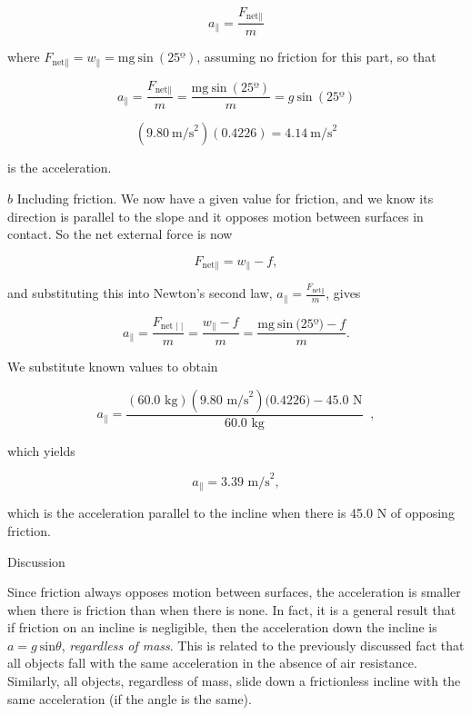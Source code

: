 \documentclass[
]{book}
\begin{document}
\leavevmode{}%
\[a_{\parallel} = \frac{F_{\text{net} \parallel}}{m}\]

where
\({{{F_{\text{net} \parallel} = w_{\parallel}} = \text{mg}\ }\text{sin}\ (\text{25º})}{}\),
assuming no friction for this part, so that

\leavevmode{}%
\[a_{\parallel} = \frac{F_{\text{net} \parallel}}{m} = \frac{\text{mg}\ \text{sin}\ (\text{25º})}{m} = g\ \text{sin}\ (\text{25º})\]

\leavevmode{}%
\[(9.80\ \text{m/s}^{2})(0.4226) = 4.14\ \text{m/s}^{2}\]

is the acceleration.

\(b\) Including friction. We now have a given value for friction, and we
know its direction is parallel to the slope and it opposes motion
between surfaces in contact. So the net external force is now

\leavevmode{}%
\[{F_{\text{net} \parallel} = {w_{\parallel} - f}},\]

and substituting this into Newton's second law,
\({a_{\parallel} = \frac{F_{\text{net} \parallel}}{m}}{}\)\emph{},
gives

\leavevmode{}%
\[{{{a_{\parallel} = \frac{F_{\text{net} \mid \mid}}{m}} = \frac{w_{\parallel} - f}{m}} = \frac{{\text{mg}\ }\text{sin}\ (\text{25º}{) - f}}{m}}.\]

We substitute known values to obtain

\leavevmode{}%
\[{a_{\parallel} = \frac{(\text{60}\text{.}\text{0\ kg})(9\text{.}\text{80\ m/s}^{2})(0\text{.}\text{4226}{) - \text{45}}\text{.}\text{0\ N}}{\text{60}\text{.}\text{0\ kg}}}\operatorname{},\]

which yields

\leavevmode{}%
\[{{a_{\parallel} = 3}\text{.}\text{39\ m/s}^{2}},\]

which is the acceleration parallel to the incline when there is 45.0 N
of opposing friction.

{Discussion}

Since friction always opposes motion between surfaces, the acceleration
is smaller when there is friction than when there is none. In fact, it
is a general result that if friction on an incline is negligible, then
the acceleration down the incline is \({{a = g\ }\text{sin}\theta}{}\),
\emph{regardless of mass}. This is related to the previously discussed fact
that all objects fall with the same acceleration in the absence of air
resistance. Similarly, all objects, regardless of mass, slide down a
frictionless incline with the same acceleration (if the angle is the
same).
\end{document}
